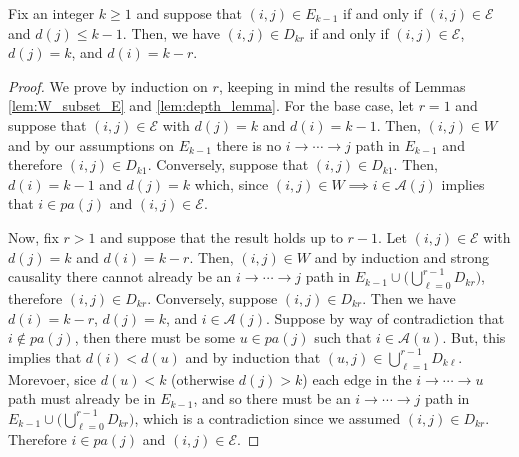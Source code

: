 \documentclass[12pt]{article}
\def\gcge{\mathcal{E}}  %
\newcommand{\pa}[1]{pa(#1)}  %
\newcommand{\anc}[1]{\mathcal{A}(#1)}  %
\newcommand{\gcgpath}[2]{#1 \rightarrow \cdots \rightarrow #2}  %
\begin{document}
\begin{lemma}
  \label{lem:inner_loop_lemma}
  Fix an integer $k \ge 1$ and suppose that $(i, j) \in E_{k - 1}$ if
  and only if $(i, j) \in \gcge$ and $d(j) \le k - 1$.  Then, we have
  $(i, j) \in D_{kr}$ if and only if $(i, j) \in \gcge $, $d(j) = k$,
  and $d(i) = k - r$.
\end{lemma}
\begin{proof}
  We prove by induction on $r$, keeping in mind the results of Lemmas
  \ref{lem:W_subset_E} and \ref{lem:depth_lemma}.  For the base case,
  let $r = 1$ and suppose that $(i, j) \in \gcge$ with $d(j) = k$ and
  $d(i) = k - 1$.  Then, $(i, j) \in W$ and by our assumptions on
  $E_{k - 1}$ there is no $\gcgpath{i}{j}$ path in $E_{k - 1}$
  and therefore $(i, j) \in D_{k1}$.  Conversely, suppose that
  $(i, j) \in D_{k1}$.  Then, $d(i) = k - 1$ and $d(j) = k$ which, since
  $(i, j) \in W \implies i \in \anc{j}$ implies that
  $i \in \pa{j}$ and $(i, j) \in \gcge$.

  Now, fix $r > 1$ and suppose that the result holds up to $r - 1$.
  Let $(i, j) \in \gcge$ with $d(j) = k$ and $d(i) = k - r$.  Then,
  $(i, j) \in W$ and by induction and strong causality there cannot
  already be an $\gcgpath{i}{j}$ path in
  $E_{k - 1} \cup \big(\bigcup_{\ell = 0}^{r - 1} D_{kr}\big)$,
  therefore $(i, j) \in D_{kr}$.  Conversely, suppose
  $(i, j) \in D_{kr}$.  Then we have $d(i) = k - r$, $d(j) = k$, and
  $i \in \anc{j}$.  Suppose by way of contradiction that
  $i \not\in \pa{j}$, then there must be some $u \in \pa{j}$ such that
  $i \in \anc{u}$.  But, this implies that $d(i) < d(u)$ and by
  induction that $(u, j) \in \bigcup_{\ell = 1}^{r - 1}D_{k\ell}$.
  Morevoer, sice $d(u) < k$ (otherwise $d(j) > k$) each edge in
  the $\gcgpath{i}{u}$ path must already be in $E_{k - 1}$, and so
  there must be an $\gcgpath{i}{j}$ path in
  $E_{k - 1}\cup\big(\bigcup_{\ell = 0}^{r - 1}D_{kr}\big)$, which is
  a contradiction since we assumed $(i, j) \in D_{kr}$.  Therefore
  $i \in \pa{j}$ and $(i, j) \in \gcge$.
\end{proof}
\end{document}
